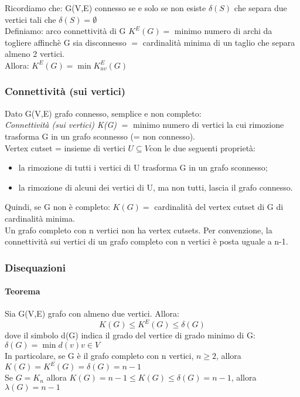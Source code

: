 Ricordiamo che: G(V,E) connesso se e solo se non esiste \( \delta(S)\) che separa due vertici tali che \( \delta(S) = \emptyset \) \\

Definiamo: arco connettività di G $K^E(G) =$ minimo numero di archi da togliere affinchè G sia disconnesso $=$ cardinalità minima di un taglio che separa almeno 2 vertici. \\
Allora: \( K^E(G) = \min K^E_{uv} (G)\)\\

\subsubsection{Connettività (sui vertici)}

Dato G(V,E) grafo connesso, semplice e non completo: \\
\emph{Connettività (sui vertici) K(G)} $=$ minimo numero di vertici la cui rimozione trasforma G in un grafo
sconnesso (= non connesso). \\

Vertex cutset = insieme di vertici $U \subseteq V $con le due seguenti proprietà:
\begin{itemize}
\item la rimozione di tutti i vertici di U trasforma G in un grafo sconnesso;
\item la rimozione di alcuni dei vertici di U, ma non tutti, lascia il grafo connesso.
\end{itemize}

Quindi, se G non è completo: \(K(G) = \) cardinalità del vertex cutset di G di cardinalità minima.\\
Un grafo completo con n vertici non ha vertex cutsets.
Per convenzione, la connettività sui vertici di un grafo completo con n vertici è posta uguale a n-1.\\

\subsubsection{Disequazioni}
\paragraph{Teorema} Sia G(V,E) grafo con almeno due vertici. Allora:
\[ K(G) \leq K^E(G) \leq \delta(G) \]
dove il simbolo d(G) indica il grado del vertice di grado minimo di G: \(\delta(G) = \min {d(v) v \in V} \)  \\
In particolare, se G è il grafo completo con n vertici, $n \geq 2$, allora \(K(G) = K^E(G) = \delta(G) =n-1\) \\
Se $G = K_n$ allora \(K(G) = n-1 \leq  K(G) \leq \delta(G) = n-1\), allora \(\lambda(G) =n-1 \) \\

